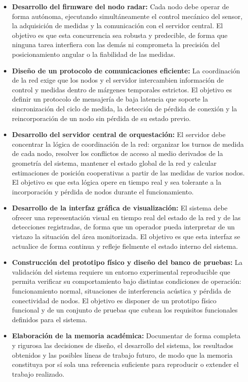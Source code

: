 \begin{itemize}
    \item \textbf{Desarrollo del firmware del nodo radar:} Cada nodo debe operar de forma autónoma, ejecutando simultáneamente el control mecánico del sensor, la adquisición de medidas y la comunicación con el servidor central. El objetivo es que esta concurrencia sea robusta y predecible, de forma que ninguna tarea interfiera con las demás ni comprometa la precisión del posicionamiento angular o la fiabilidad de las medidas.

    \item \textbf{Diseño de un protocolo de comunicaciones eficiente:} La coordinación de la red exige que los nodos y el servidor intercambien información de control y medidas dentro de márgenes temporales estrictos. El objetivo es definir un protocolo de mensajería de baja latencia que soporte la sincronización del ciclo de medida, la detección de pérdida de conexión y la reincorporación de un nodo sin pérdida de su estado previo.

    \item \textbf{Desarrollo del servidor central de orquestación:} El servidor debe concentrar la lógica de coordinación de la red: organizar los turnos de medida de cada nodo, resolver los conflictos de acceso al medio derivados de la geometría del sistema, mantener el estado global de la red y calcular estimaciones de posición cooperativas a partir de las medidas de varios nodos. El objetivo es que esta lógica opere en tiempo real y sea tolerante a la incorporación y pérdida de nodos durante el funcionamiento.

    \item \textbf{Desarrollo de la interfaz gráfica de visualización:} El sistema debe ofrecer una representación visual en tiempo real del estado de la red y de las detecciones registradas, de forma que un operador pueda interpretar de un vistazo la situación del área monitorizada. El objetivo es que esta interfaz se actualice de forma continua y refleje fielmente el estado interno del sistema.

    \item \textbf{Construcción del prototipo físico y diseño del banco de pruebas:} La validación del sistema requiere un entorno experimental reproducible que permita verificar su comportamiento bajo distintas condiciones de operación: funcionamiento normal, situaciones de interferencia acústica y pérdida de conectividad de nodos. El objetivo es disponer de un prototipo físico funcional y de un conjunto de pruebas que cubran los requisitos funcionales definidos para el sistema.

    \item \textbf{Elaboración de la memoria académica:} Documentar de forma completa y rigurosa las decisiones de diseño, el desarrollo del sistema, los resultados obtenidos y las posibles líneas de trabajo futuro, de modo que la memoria constituya por sí sola una referencia suficiente para reproducir o extender el trabajo realizado.
\end{itemize}

